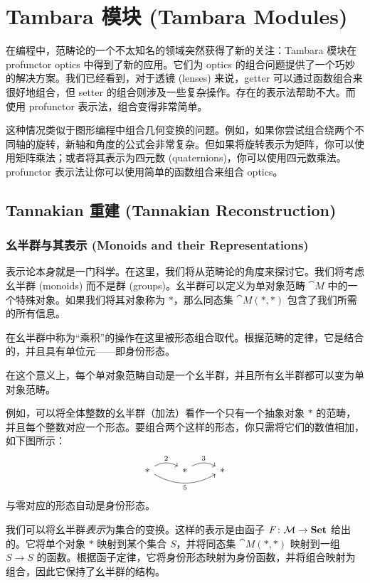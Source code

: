\documentclass[DaoFP]{subfiles}
\begin{document}
 \setcounter{chapter}{17}

 \chapter{Tambara 模块 (Tambara Modules)}

 在编程中，范畴论的一个不太知名的领域突然获得了新的关注：Tambara 模块在 profunctor optics 中得到了新的应用。它们为 optics 的组合问题提供了一个巧妙的解决方案。我们已经看到，对于透镜 (lenses) 来说，getter 可以通过函数组合来很好地组合，但 setter 的组合则涉及一些复杂操作。存在的表示法帮助不大。而使用 profunctor 表示法，组合变得非常简单。

 这种情况类似于图形编程中组合几何变换的问题。例如，如果你尝试组合绕两个不同轴的旋转，新轴和角度的公式会非常复杂。但如果将旋转表示为矩阵，你可以使用矩阵乘法；或者将其表示为四元数 (quaternions)，你可以使用四元数乘法。profunctor 表示法让你可以使用简单的函数组合来组合 optics。

 \section{Tannakian 重建 (Tannakian Reconstruction)}

 \subsection{幺半群与其表示 (Monoids and their Representations)}

 表示论本身就是一门科学。在这里，我们将从范畴论的角度来探讨它。我们将考虑幺半群 (monoids) 而不是群 (groups)。幺半群可以定义为单对象范畴 $\cat M$ 中的一个特殊对象。如果我们将其对象称为 $*$，那么同态集 $\cat M( *, *)$ 包含了我们所需的所有信息。

 在幺半群中称为“乘积”的操作在这里被形态组合取代。根据范畴的定律，它是结合的，并且具有单位元——即身份形态。

 在这个意义上，每个单对象范畴自动是一个幺半群，并且所有幺半群都可以变为单对象范畴。

 例如，可以将全体整数的幺半群（加法）看作一个只有一个抽象对象 $*$ 的范畴，并且每个整数对应一个形态。要组合两个这样的形态，你只需将它们的数值相加，如下图所示：
 \[
  \begin{tikzcd}
   *
   \arrow[r, bend left, "2"]
   \arrow[rr, bend right, "5"']
   & *
   \arrow[r, bend left, "3"]
   & *
  \end{tikzcd}
 \]
 与零对应的形态自动是身份形态。

 我们可以将幺半群\emph{表示}为集合的变换。这样的表示是由函子 $F \colon \mathcal{M} \to \mathbf{Set}$ 给出的。它将单个对象 $*$ 映射到某个集合 $S$，并将同态集 $\cat M(*, *)$ 映射到一组 $S \to S$ 的函数。根据函子定律，它将身份形态映射为身份函数，并将组合映射为组合，因此它保持了幺半群的结构。
\end{document}

